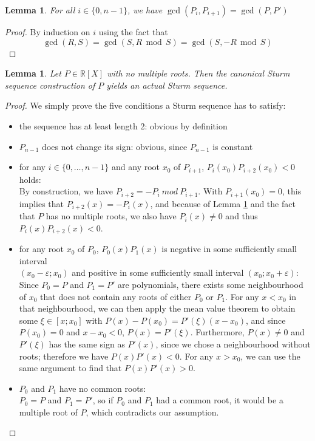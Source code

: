 \documentclass[11pt,a4paper,oneside]{article}
\newtheorem{lemma}[definition]{Lemma}
\newcommand{\RR}{\mathbb{R}}
\renewcommand{\epsilon}{\varepsilon}
\renewcommand{\mod}{\ \ \textrm{mod}\ \ }
\begin{document}
\begin{lemma}\label{thm:sturm_gcd}
For all $i\in\{0,n-1\}$, we have $\gcd(P_i, P_{i+1}) = \gcd(P,P')$
\end{lemma}
\begin{proof}
By induction on $i$ using the fact that $$\gcd(R,S)=\gcd(S,R\mod S)=\gcd(S,-R\mod S)$$\vskip-3mm
\end{proof}\vskip3mm

\begin{lemma}\label{thm:sturm_seq_canonical}
Let $P\in\RR[X]$ with no multiple roots. Then the canonical Sturm sequence construction of $P$ yields an actual Sturm sequence.
\end{lemma}
\begin{proof}
We simply prove the five conditions a Sturm sequence has to satisfy:
\begin{itemize}
\item the sequence has at least length 2: obvious by definition
\item $P_{n-1}$ does not change its sign: obvious, since $P_{n-1}$ is constant
\item for any $i\in\{0,\ldots,n-1\}$ and any root $x_0$ of $P_{i+1}$, $P_{i}(x_0)P_{i+2}(x_0) < 0$ holds:\\
By construction, we have $P_{i+2} = -P_{i}\ \textit{mod}\ P_{i+1}$. With $P_{i+1}(x_0)=0$, this implies that $P_{i+2}(x) = -P_i(x)$, and because of Lemma \ref{thm:sturm_gcd} and the fact that $P$ has no multiple roots, we also have $P_i(x)\neq 0$ and thus $P_i(x)P_{i+2}(x)<0$.
\item for any root $x_0$ of $P_0$, $P_0(x)P_1(x)$ is negative in some sufficiently small interval\\ \mbox{$(x_0-\epsilon;x_0)$} and positive in some sufficiently small interval $(x_0;x_0+\epsilon)$:\\
Since $P_0=P$ and $P_1=P'$ are polynomials, there exists some neighbourhood of $x_0$ that does not contain any roots of either $P_0$ or $P_1$. For any $x<x_0$ in that neighbourhood, we can then apply the mean value theorem to obtain some $\xi\in[x;x_0]$ with $P(x)-P(x_0) = P'(\xi)(x-x_0)$, and since $P(x_0)=0$ and $x-x_0<0$, $P(x)=P'(\xi)$. Furthermore, $P(x)\neq 0$ and $P'(\xi)$ has the same sign as $P'(x)$, since we chose a neighbourhood without roots; therefore we have $P(x)P'(x)<0$. For any $x>x_0$, we can use the same argument to find that $P(x)P'(x)>0$.
\item $P_0$ and $P_1$ have no common roots:\\
$P_0=P$ and $P_1=P'$, so if $P_0$ and $P_1$ had a common root, it would be a multiple root of $P$, which contradicts our assumption.
\end{itemize}
\end{proof}
\end{document}
